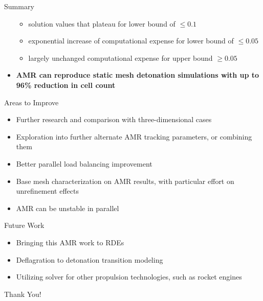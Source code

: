 \begin{frame}[allowframebreaks]{Summary}
\begin{itemize}
\begin{itemize}
    \item solution values that plateau for lower bound of $\leq 0.1$
    \item exponential increase of computational expense for lower bound of $\leq 0.05$
    \item largely unchanged computational expense for upper bound $\geq 0.05$
\end{itemize}
\item \textbf{AMR can reproduce static mesh detonation simulations with up to 96\% reduction in cell count}

\end{itemize}
\end{frame}


\begin{frame}{Areas to Improve}
\begin{itemize}
\item Further research and comparison with three-dimensional cases 
\item Exploration into further alternate AMR tracking parameters, or combining them 
\item Better parallel load balancing improvement 
\item Base mesh characterization on AMR results, with particular effort on unrefinement effects
\item AMR can be unstable in parallel 
\end{itemize}
\end{frame}

\begin{frame}{Future Work}
\begin{itemize}
\item Bringing this AMR work to RDEs
\item Deflagration to detonation transition modeling
\item Utilizing solver for other propulsion technologies, such as rocket engines
\end{itemize}
\end{frame}

\begin{frame}
\begin{center}
{\Huge Thank You!}    
\end{center}
\end{frame}